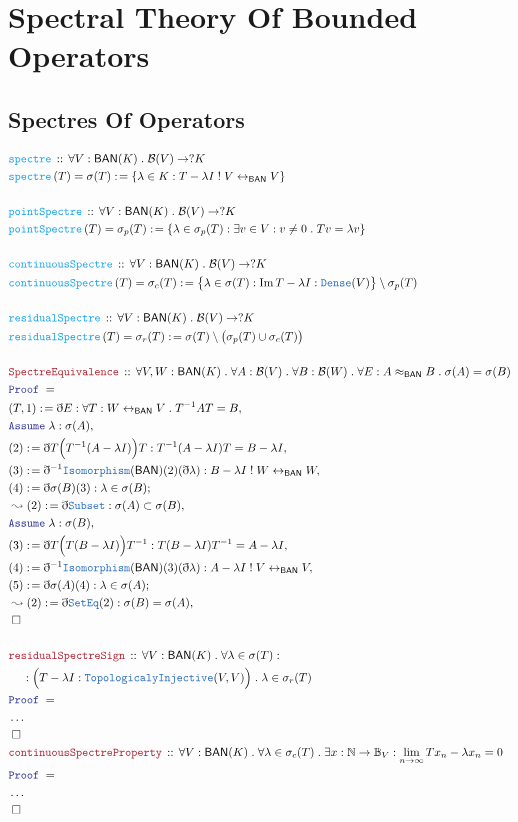 \documentclass[12pt]{scrartcl}
\newcommand{\TYPE}[1]{\textcolor{NavyBlue}{\mathtt{#1}}}
\newcommand{\FUNC}[1]{\textcolor{Cerulean}{\mathtt{#1}}}
\newcommand{\LOGIC}[1]{\textcolor{Blue}{\mathtt{#1}}}
\newcommand{\THM}[1]{\textcolor{Maroon}{\mathtt{#1}}}
\renewcommand{\.}{\; . \;}
\newcommand{\de}{: \kern 0.1pc =}
\newcommand{\IsNot}{\; ! \;}
\newcommand{\Act}[1]{\left( #1 \right)}
\newcommand{\Theorem}[2]{& \THM{#1} \, :: \, #2 \\ & \Proof = \\ }
\newcommand{\DeclareFunc}[2]{& \FUNC{#1} \, :: \, #2 \\}
\newcommand{\DefineNamedFunc}[4]{&  \FUNC{#1}\Act{#2} = #3 \de #4 \\}
\newcommand{\NewLine}{\\ & \kern 1pc}
\newcommand{\Page}[1]{\begin{align*} #1 \end{align*} \newpage   }
\newcommand{ \bd }{ \ByDef }
\newcommand{\NoProof}{ & \ldots \\ \EndProof}
\newcommand{\Nat}{\mathbb{N} }
\DeclareMathOperator*{\im}{Im}
\newcommand{\ToBij}{\leftrightarrow}
\newcommand{\Say}[3]{& #1 \de #2 : #3, \\}
\newcommand{\Conclude}[3]{& #1 \de #2 : #3; \\}
\newcommand{\Derive}[3]{& \leadsto #1 \de #2 : #3, \\}
\newcommand{\A}{\LOGIC{Assume} \;}
\newcommand{\Assume}[2]{& \A #1 : #2, \\}
\newcommand{\QED}{\; \square}
\newcommand{\EndProof}{& \QED \\}
\newcommand{\ByDef}{\eth}
\newcommand{\Proof}{\LOGIC{Proof} \; }
\newcommand{\Ball}{ \mathbb{B} }
\newcommand{\spec}{\sigma}
\newcommand{\BAN}{\mathsf{BAN}} %
\newcommand{\B}{\mathcal{B}}
\renewcommand{\l}{\lambda}
\begin{document}
\section{Spectral Theory Of Bounded Operators}
\subsection{Spectres Of Operators}
\Page{
	\DeclareFunc{spectre}{ \forall V : \BAN(K) \. \B(V) \to ?K }
	\DefineNamedFunc{spectre}{T}{\spec (T) }{ \{ \l \in K : T - \l I  \IsNot V \ToBij_{\BAN} V \} }
	\\
	\DeclareFunc{pointSpectre}{ \forall V : \BAN(K) \. \B(V) \to ?K }
	\DefineNamedFunc{pointSpectre}{T}{ \spec_p(T) }{ \{ \l \in \spec_p(T) : \exists v \in V : v \neq 0 \. Tv = \l v  \}  }
	\\
	\DeclareFunc{continuousSpectre}{ \forall V : \BAN(K) \. \B(V) \to ?K  }
	\DefineNamedFunc{continuousSpectre}{T}{ \spec_c(T) }{ 
	\big\{ \l \in \spec(T) : \im T - \l I : \TYPE{Dense}(V) \big\} \setminus \spec_p(T) }
	\\
	\DeclareFunc{residualSpectre}{\forall V : \BAN(K) \. \B(V) \to ?K}
	\DefineNamedFunc{residualSpectre}{T}{\spec_r(T)}{ \spec(T) \setminus \big( \spec_p(T) \cup \spec_c(T) \big) }
	\\
	\Theorem{SpectreEquivalence}{\forall V,W : \BAN(K) \. \forall A : \B(V) \.  \forall B : \B(W) \. 
		\forall E : A \approx_\BAN B \. \spec(A) = \spec(B)
	}
	\Say{(T,1)}{\bd E}{\forall T : W \ToBij_\BAN V \. T^{-1}AT = B }
	\Assume{\l}{\spec(A)}
	\Say{(2)}{\bd T\Big(T^{-1}(A-\l I)\Big) T}{ T^{-1} (A - \l I) T = B - \l I  }
	\Say{(3)}{\bd^{-1} \TYPE{Isomorphism}(\BAN)(2)(\bd \l)}{  B - \l I  \IsNot  W \ToBij_\BAN W  }
	\Conclude{(4)}{\bd \spec(B)(3) }{\l \in \spec(B)}
	\Derive{(2)}{\bd \TYPE{Subset}}{\spec(A) \subset \spec(B)}
	\Assume{\l}{\spec(B)}
	\Say{(3)}{\bd T\Big(T(B-\l I)\Big) T^{-1}}{ T (B - \l I) T^{-1} = A - \l I  }
	\Say{(4)}{\bd^{-1} \TYPE{Isomorphism}(\BAN)(3)(\bd \l)}{  A - \l I  \IsNot  V \ToBij_\BAN V  }
	\Conclude{(5)}{\bd \spec(A)(4) }{\l \in \spec(A)}
	\Derive{(2)}{\bd \TYPE{SetEq}(2)}{\spec(B) = \spec(A)}
	\EndProof \\
	\Theorem{residualSpectreSign}{ \forall V : \BAN(K) \. \forall \l \in \spec(T)  : 
	\NewLine :
	\Big( T - \l I : \TYPE{TopologicalyInjective}(V,V) \Big) \. \l \in \spec_r(T)}
	\NoProof
	\Theorem{continuousSpectreProperty}{\forall V : \BAN(K) \. \forall \l \in \spec_c(T) \. \exists x : \Nat \to \Ball_V :
	  \lim_{n \to \infty} Tx_n - \l x_n = 0
	}
	\NoProof
}
\end{document}

